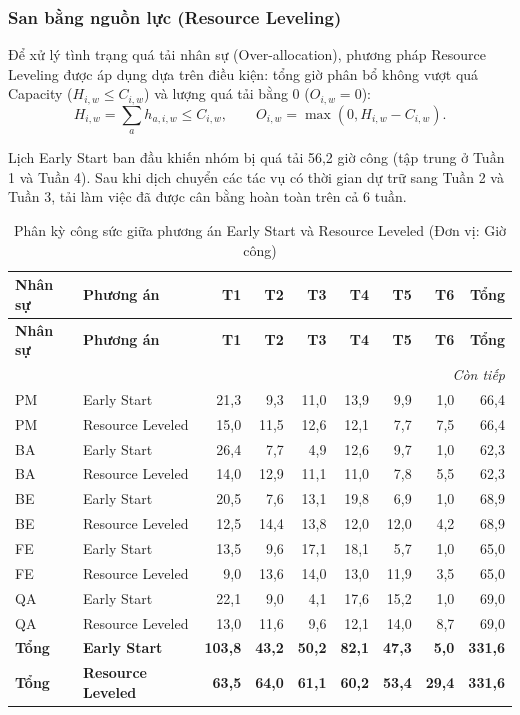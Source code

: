 \subsubsection{San bằng nguồn lực (Resource Leveling)}

Để xử lý tình trạng quá tải nhân sự (Over-allocation), phương pháp Resource Leveling được áp dụng dựa trên điều kiện: tổng giờ phân bổ không vượt quá Capacity ($H_{i,w} \le C_{i,w}$) và lượng quá tải bằng 0 ($O_{i,w} = 0$):
\[H_{i,w}=\sum_a h_{a,i,w}\le C_{i,w},\qquad O_{i,w}=\max(0, H_{i,w}-C_{i,w}).\]

Lịch Early Start ban đầu khiến nhóm bị quá tải 56,2 giờ công (tập trung ở Tuần 1 và Tuần 4). Sau khi dịch chuyển các tác vụ có thời gian dự trữ sang Tuần 2 và Tuần 3, tải làm việc đã được cân bằng hoàn toàn trên cả 6 tuần.

\begingroup\small
\setlength{\tabcolsep}{4pt}\renewcommand{\arraystretch}{1.15}
\begin{longtable}{@{}ll*{7}{r}@{}}
\caption{Phân kỳ công sức giữa phương án Early Start và Resource Leveled (Đơn vị: Giờ công)}\label{tab:weekly}\\
\toprule
\textbf{Nhân sự} & \textbf{Phương án} & \textbf{T1} & \textbf{T2} & \textbf{T3} & \textbf{T4} & \textbf{T5} & \textbf{T6} & \textbf{Tổng} \\
\midrule\endfirsthead
\toprule
\textbf{Nhân sự} & \textbf{Phương án} & \textbf{T1} & \textbf{T2} & \textbf{T3} & \textbf{T4} & \textbf{T5} & \textbf{T6} & \textbf{Tổng} \\
\midrule\endhead
\midrule\multicolumn{9}{r}{\textit{Còn tiếp}}\\\endfoot
\bottomrule\endlastfoot
PM & Early Start & 21,3 & 9,3 & 11,0 & 13,9 & 9,9 & 1,0 & 66,4 \\
PM & Resource Leveled & 15,0 & 11,5 & 12,6 & 12,1 & 7,7 & 7,5 & 66,4 \\
BA & Early Start & 26,4 & 7,7 & 4,9 & 12,6 & 9,7 & 1,0 & 62,3 \\
BA & Resource Leveled & 14,0 & 12,9 & 11,1 & 11,0 & 7,8 & 5,5 & 62,3 \\
BE & Early Start & 20,5 & 7,6 & 13,1 & 19,8 & 6,9 & 1,0 & 68,9 \\
BE & Resource Leveled & 12,5 & 14,4 & 13,8 & 12,0 & 12,0 & 4,2 & 68,9 \\
FE & Early Start & 13,5 & 9,6 & 17,1 & 18,1 & 5,7 & 1,0 & 65,0 \\
FE & Resource Leveled & 9,0 & 13,6 & 14,0 & 13,0 & 11,9 & 3,5 & 65,0 \\
QA & Early Start & 22,1 & 9,0 & 4,1 & 17,6 & 15,2 & 1,0 & 69,0 \\
QA & Resource Leveled & 13,0 & 11,6 & 9,6 & 12,1 & 14,0 & 8,7 & 69,0 \\
\textbf{Tổng} & \textbf{Early Start} & \textbf{103,8} & \textbf{43,2} & \textbf{50,2} & \textbf{82,1} & \textbf{47,3} & \textbf{5,0} & \textbf{331,6} \\
\textbf{Tổng} & \textbf{Resource Leveled} & \textbf{63,5} & \textbf{64,0} & \textbf{61,1} & \textbf{60,2} & \textbf{53,4} & \textbf{29,4} & \textbf{331,6} \\
\end{longtable}\endgroup


